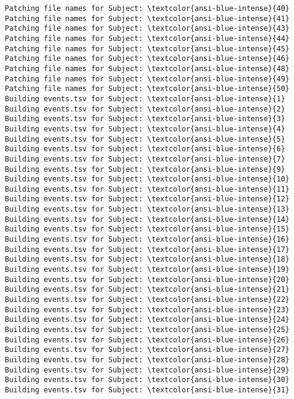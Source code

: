 \documentclass[11pt]{article}
\begin{document}
\begin{Verbatim}[commandchars=\\\{\}]
Patching file names for Subject: \textcolor{ansi-blue-intense}{40}
Patching file names for Subject: \textcolor{ansi-blue-intense}{41}
Patching file names for Subject: \textcolor{ansi-blue-intense}{43}
Patching file names for Subject: \textcolor{ansi-blue-intense}{44}
Patching file names for Subject: \textcolor{ansi-blue-intense}{45}
Patching file names for Subject: \textcolor{ansi-blue-intense}{46}
Patching file names for Subject: \textcolor{ansi-blue-intense}{48}
Patching file names for Subject: \textcolor{ansi-blue-intense}{49}
Patching file names for Subject: \textcolor{ansi-blue-intense}{50}
Building events.tsv for Subject: \textcolor{ansi-blue-intense}{1}
Building events.tsv for Subject: \textcolor{ansi-blue-intense}{2}
Building events.tsv for Subject: \textcolor{ansi-blue-intense}{3}
Building events.tsv for Subject: \textcolor{ansi-blue-intense}{4}
Building events.tsv for Subject: \textcolor{ansi-blue-intense}{5}
Building events.tsv for Subject: \textcolor{ansi-blue-intense}{6}
Building events.tsv for Subject: \textcolor{ansi-blue-intense}{7}
Building events.tsv for Subject: \textcolor{ansi-blue-intense}{9}
Building events.tsv for Subject: \textcolor{ansi-blue-intense}{10}
Building events.tsv for Subject: \textcolor{ansi-blue-intense}{11}
Building events.tsv for Subject: \textcolor{ansi-blue-intense}{12}
Building events.tsv for Subject: \textcolor{ansi-blue-intense}{13}
Building events.tsv for Subject: \textcolor{ansi-blue-intense}{14}
Building events.tsv for Subject: \textcolor{ansi-blue-intense}{15}
Building events.tsv for Subject: \textcolor{ansi-blue-intense}{16}
Building events.tsv for Subject: \textcolor{ansi-blue-intense}{17}
Building events.tsv for Subject: \textcolor{ansi-blue-intense}{18}
Building events.tsv for Subject: \textcolor{ansi-blue-intense}{19}
Building events.tsv for Subject: \textcolor{ansi-blue-intense}{20}
Building events.tsv for Subject: \textcolor{ansi-blue-intense}{21}
Building events.tsv for Subject: \textcolor{ansi-blue-intense}{22}
Building events.tsv for Subject: \textcolor{ansi-blue-intense}{23}
Building events.tsv for Subject: \textcolor{ansi-blue-intense}{24}
Building events.tsv for Subject: \textcolor{ansi-blue-intense}{25}
Building events.tsv for Subject: \textcolor{ansi-blue-intense}{26}
Building events.tsv for Subject: \textcolor{ansi-blue-intense}{27}
Building events.tsv for Subject: \textcolor{ansi-blue-intense}{28}
Building events.tsv for Subject: \textcolor{ansi-blue-intense}{29}
Building events.tsv for Subject: \textcolor{ansi-blue-intense}{30}
Building events.tsv for Subject: \textcolor{ansi-blue-intense}{31}

\end{Verbatim}
\end{document}
